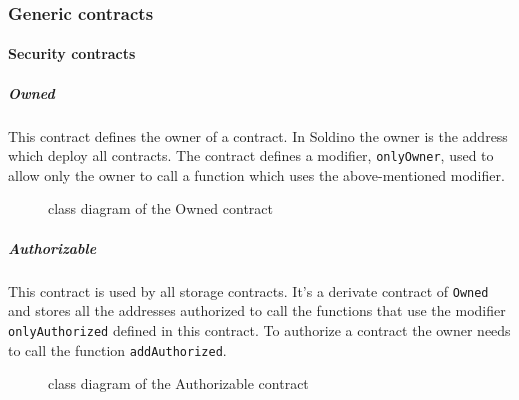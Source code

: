 \subsubsection{Generic contracts}
\paragraph{Security contracts}
\subparagraph{Owned}
This contract defines the owner of a contract. In Soldino the owner is the address which deploy all contracts. The contract defines a modifier, \texttt{onlyOwner}, used to allow only the owner to call a function which uses 
the above-mentioned modifier.
\begin{figure}[H]
	\centering
	\caption{class diagram of the Owned contract}
\end{figure}

\subparagraph{Authorizable}
This contract is used by all storage contracts. It's a derivate contract of \texttt{Owned} and stores 
all the addresses authorized to call the functions that use the modifier \texttt{onlyAuthorized} defined in this contract.
To authorize a contract the owner needs to call the function \texttt{addAuthorized}.
\begin{figure}[H]
	\centering
	\caption{class diagram of the Authorizable contract}
\end{figure}
\pagebreak

